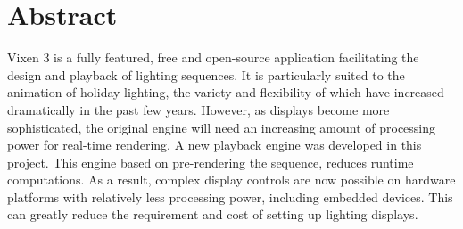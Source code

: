 \renewcommand{\baselinestretch}{1.5}
\chapter{Abstract}
\renewcommand{\baselinestretch}{\mystretch}



Vixen 3 is a fully featured, free and open-source application facilitating the design and playback of lighting sequences. It is particularly suited to the animation of holiday lighting, the variety and flexibility of which have increased dramatically in the past few years. However, as displays become more sophisticated, the original engine will need an increasing amount of processing power for real-time rendering. A new playback engine was developed in this project. This engine based on pre-rendering the sequence, reduces runtime computations. As a result, complex display controls are now possible on hardware platforms with relatively less processing power, including embedded devices. This can greatly reduce the requirement and cost of setting up lighting displays.

